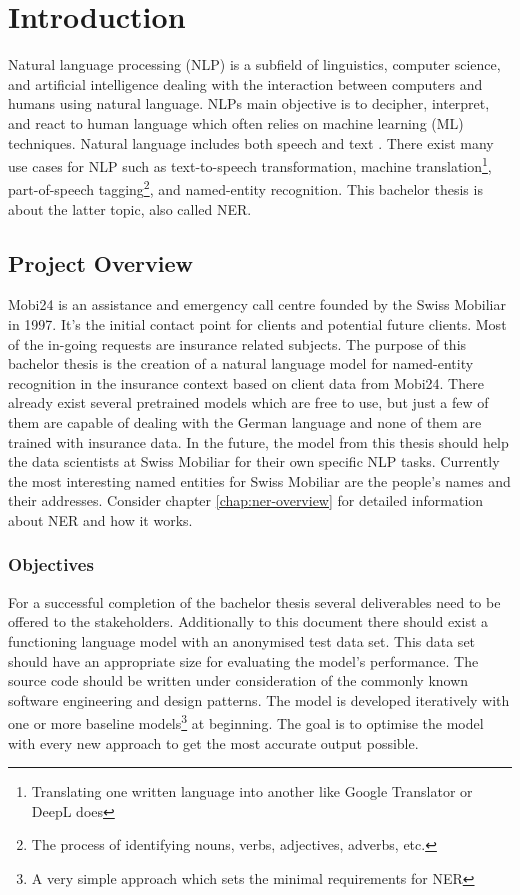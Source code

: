 \chapter{Introduction}

Natural language processing (NLP) is a subfield of linguistics, computer science, and artificial intelligence dealing with the interaction between computers and humans using natural language. NLPs main objective is to decipher, interpret, and react to human language which often relies on machine learning (ML) techniques. Natural language includes both speech and text \cite{garbade}. There exist many use cases for NLP such as text-to-speech transformation, machine translation\footnote{Translating one written language into another like Google Translator or DeepL does}, part-of-speech tagging\footnote{The process of identifying nouns, verbs, adjectives, adverbs, etc.}, and named-entity recognition. This bachelor thesis is about the latter topic, also called NER.

\section{Project Overview}

Mobi24 is an assistance and emergency call centre founded by the Swiss Mobiliar in 1997. It's the initial contact point for clients and potential future clients. Most of the in-going requests are insurance related subjects. The purpose of this bachelor thesis is the creation of a natural language model for named-entity recognition in the insurance context based on client data from Mobi24. There already exist several pretrained models which are free to use, but just a few of them are capable of dealing with the German language and none of them are trained with insurance data. In the future, the model from this thesis should help the data scientists at Swiss Mobiliar for their own specific NLP tasks. Currently the most interesting named entities for Swiss Mobiliar are the people's names and their addresses. Consider chapter \ref{chap:ner-overview} for detailed information about NER and how it works.

\subsection{Objectives}

For a successful completion of the bachelor thesis several deliverables need to be offered to the stakeholders. Additionally to this document there should exist a functioning language model with an anonymised test data set. This data set should have an appropriate size for evaluating the model's performance. The source code should be written under consideration of the commonly known software engineering and design patterns. The model is developed iteratively with one or more baseline models\footnote{A very simple approach which sets the minimal requirements for NER} at beginning. The goal is to optimise the model with every new approach to get the most accurate output possible.

